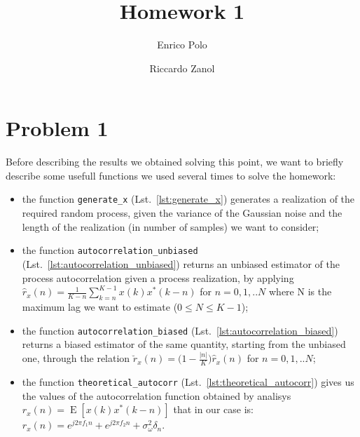 \documentclass{article}
\author{Enrico Polo \and Riccardo Zanol}
\title{Homework 1}
\newcommand{\inlinecode}[1]{\lstinline[basicstyle=\ttfamily,
    keywordstyle={}]{#1}}
\newcommand{\E}[1]{\operatorname{E}\left[#1\right]}
\begin{document}
\maketitle
\section*{Problem 1}
Before describing the results we obtained solving this point, we want to briefly describe some usefull functions we used several times to solve the homework:
\begin{itemize}
 \item the function \inlinecode{generate_x} (Lst.~\ref{lst:generate_x}) generates a realization of the required random process, given the variance of the Gaussian noise and the length of the realization (in number of samples) we want to consider;
 \item the function \inlinecode{autocorrelation_unbiased} (Lst.~\ref{lst:autocorrelation_unbiased}) returns an unbiased estimator of the process autocorrelation given a process realization, by applying $\hat{r}_x(n) = \frac{1}{K-n} \sum_{k=n}^{K-1} {x(k)x^*(k-n)}$ for $n = 0,1,..N$ where N is the maximum lag we want to estimate ($0\leq N \leq K-1$);
 \item the function \inlinecode{autocorrelation_biased} (Lst.~\ref{lst:autocorrelation_biased}) returns a biased estimator of the same quantity, starting from the unbiased one, through the relation $\breve{r}_x(n) = \bigl( 1 - \frac{|n|}{K}\bigr) \hat{r}_x(n)$ for $n = 0,1,..N$;
 \item  the function \inlinecode{theoretical_autocorr} (Lst.~\ref{lst:theoretical_autocorr}) gives us the values of the autocorrelation function obtained by analisys $r_x (n) =  \E{x(k)x^*(k-n)}$ that in our case is: $r_x (n) = e^{j2 \pi f_1n} + e^{j2\pi f_2n} + \sigma_\omega^2 \delta_n$.
\end{itemize}
\end{document}

